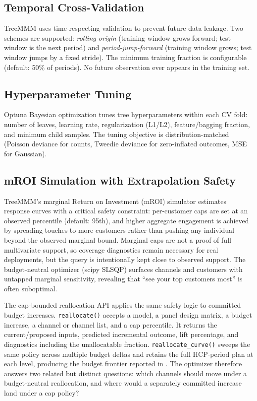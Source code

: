 \documentclass[review,12pt]{elsarticle}
\begin{document}
\subsection{Temporal Cross-Validation}
\label{sec:methods:cv}

TreeMMM uses time-respecting validation to prevent future data leakage. Two
schemes are supported: \emph{rolling origin} (training window grows forward;
test window is the next period) and \emph{period-jump-forward} (training window
grows; test window jumps by a fixed stride). The minimum training fraction is
configurable (default: 50\% of periods). No future observation ever appears in
the training set.

\subsection{Hyperparameter Tuning}
\label{sec:methods:tuning}

Optuna \cite{akiba2019optuna} Bayesian optimization tunes tree hyperparameters
within each CV fold: number of leaves, learning rate, regularization (L1/L2),
feature/bagging fraction, and minimum child samples. The tuning objective is
distribution-matched (Poisson deviance for counts, Tweedie deviance for
zero-inflated outcomes, MSE for Gaussian).

\subsection{mROI Simulation with Extrapolation Safety}
\label{sec:methods:mroi}

TreeMMM's marginal Return on Investment (mROI) simulator estimates response
curves with a critical safety constraint: per-customer caps are set at an
observed percentile (default: 95th), and higher aggregate engagement is
achieved by spreading touches to more customers rather than pushing any
individual beyond the observed marginal bound. Marginal caps are not a proof of
full multivariate support, so coverage diagnostics remain necessary for real
deployments, but the query is intentionally kept close to observed support. The
budget-neutral optimizer (scipy SLSQP) surfaces channels and customers with
untapped marginal sensitivity, revealing that ``see your top customers most''
is often suboptimal.

The cap-bounded reallocation API applies the same safety logic to committed
budget increases. \texttt{reallocate()} accepts a model, a panel design matrix,
a budget increase, a channel or channel list, and a cap percentile. It returns
the current/proposed inputs, predicted incremental outcome, lift percentage,
and diagnostics including the unallocatable fraction. \texttt{reallocate\_curve()}
sweeps the same policy across multiple budget deltas and retains the full
HCP-period plan at each level, producing the budget frontier reported in
. The optimizer therefore answers two related but
distinct questions: which channels should move under a budget-neutral
reallocation, and where would a separately committed increase land under a
cap policy?
\end{document}
